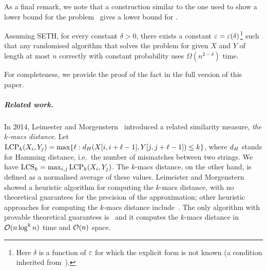 As a final remark, we note that a construction similar to the one used to show a lower bound for the \kLCS problem~\cite{DBLP:journals/algorithmica/KociumakaRS19} gives a lower bound for \kApproxLCS. 

\begin{fact}\label{lm:klcs_lower}
Assuming SETH, for every constant $\delta > 0$, there exists a constant $\varepsilon = \varepsilon(\delta)$\footnote{Here $\delta$ is a function of $\varepsilon$ for which the explicit form is not known (a condition inherited from~\cite{DBLP:journals/corr/abs-1803-00904}).} such that any randomised algorithm that solves the \kApproxLCS problem for given $X$ and $Y$ of length at most $n$ correctly with constant probability uses $\Omega(n^{2-\delta})$ time. 
\end{fact}

For completeness, we provide the proof of the fact in the full version of this paper.

\subparagraph*{Related work.}
In 2014, Leimester and Morgenstern~\cite{kmacs} introduced a related similarity measure, \emph{the $k$-macs distance}. Let $\mathrm{LCP}_{k} (X_i, Y_j) = \max\{\ell: d_H(X[i,i+\ell-1], Y[j, j+\ell-1]) \le k\}$, where $d_H$ stands for Hamming distance, i.e.\ the number of mismatches between two strings. We have $\mathrm{LCS}_{k} = \max_{i,j} \mathrm{LCP}_{k}(X_i, Y_j)$. The $k$-macs distance, on the other hand, is defined as a normalised average of these values.  Leimeister and Morgenstern~\cite{kmacs} showed a heuristic algorithm for computing the $k$-macs distance, with no theoretical guarantees for the precision of the approximation; other heuristic approaches for computing the $k$-macs distance include~\cite{DBLP:journals/jcb/ThankachanCLAA16,Thankachan2017}. The only algorithm with provable theoretical guarantees is~\cite{DBLP:journals/jcb/ThankachanAA16} and it computes the $k$-macs distance in $\mathcal{O}(n \log^k n)$ time and $\mathcal{O}(n)$ space.

